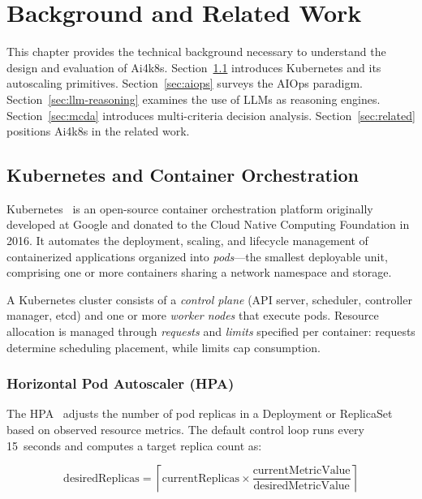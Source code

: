 \chapter{Background and Related Work}
\label{ch:background}

This chapter provides the technical background necessary to understand the design
and evaluation of Ai4k8s. Section~\ref{sec:kubernetes} introduces Kubernetes and
its autoscaling primitives. Section~\ref{sec:aiops} surveys the AIOps paradigm.
Section~\ref{sec:llm-reasoning} examines the use of \glspl{LLM} as reasoning
engines. Section~\ref{sec:mcda} introduces multi-criteria decision analysis.
Section~\ref{sec:related} positions Ai4k8s in the related work.

\section{Kubernetes and Container Orchestration}
\label{sec:kubernetes}

Kubernetes~\cite{k8s2014} is an open-source container orchestration platform
originally developed at Google and donated to the Cloud Native Computing Foundation
in 2016. It automates the deployment, scaling, and lifecycle management of
containerized applications organized into \textit{pods}—the smallest deployable
unit, comprising one or more containers sharing a network namespace and storage.

A Kubernetes cluster consists of a \textit{control plane} (API server, scheduler,
controller manager, etcd) and one or more \textit{worker nodes} that execute pods.
Resource allocation is managed through \textit{requests} and \textit{limits}
specified per container: requests determine scheduling placement, while limits
cap consumption.

\subsection{Horizontal Pod Autoscaler (HPA)}
\label{sec:hpa}

The \gls{HPA}~\cite{k8s-hpa} adjusts the number of pod replicas in a Deployment
or ReplicaSet based on observed resource metrics. The default control loop runs
every 15~seconds and computes a target replica count as:

\begin{equation}
  \text{desiredReplicas} = \left\lceil
    \text{currentReplicas} \times
    \frac{\text{currentMetricValue}}{\text{desiredMetricValue}}
  \right\rceil
  \label{eq:hpa}
\end{equation}

